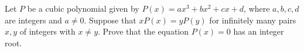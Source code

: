 Let $P$ be a cubic polynomial given by $P(x) = ax^3 + bx^2 + cx + d$, where $a, b, c, d$ are integers and $a \neq 0$. Suppose that $xP(x) = yP(y)$ for infinitely many pairs $x, y$ of integers with $x \neq y$. Prove that the equation $P(x) = 0$ has an integer root.
